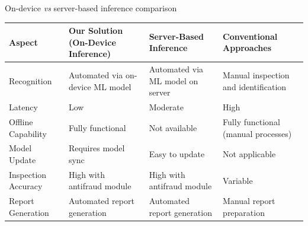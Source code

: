 \documentclass{beamer}%
\begin{document}
\begin{frame}{On-device \textit{vs} server-based inference comparison}
\footnotesize


\begin{table}[h!]
\centering\begin{tabulary}{1.03\textwidth}{LLLL}
\toprule
\textbf{Aspect}  & \textbf{Our Solution (On-Device Inference)}   & \textbf{Server-Based Inference}  & \textbf{Conventional Approaches}    \\
\midrule
Recognition  & Automated via on-device ML model   & Automated via ML model on server & Manual inspection and identification \\
Latency             & Low                                & Moderate                         & High                                 \\
Offline Capability  & Fully functional                   & Not available                    & Fully functional (manual processes)  \\
Model Update        & Requires model sync                & Easy to update                   & Not applicable                       \\
Inspection Accuracy & High with antifraud module         & High with antifraud module       & Variable                             \\
Report Generation   & Automated report generation        & Automated report generation      & Manual report preparation            \\
\bottomrule
\end{tabulary}
\label{table:solution_comparison}
\end{table}




\end{frame}
\end{document}
